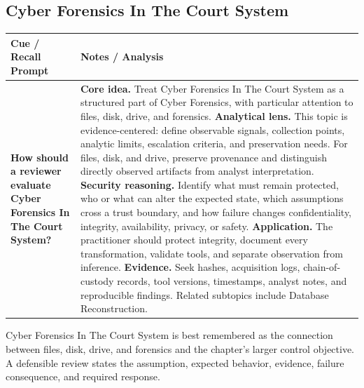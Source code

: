 \documentclass[11pt]{article}
\newcommand{\CornellHeader}{%
\rowcolor{Navy}\color{white}\bfseries Cue / Recall Prompt & \color{white}\bfseries Notes / Analysis\\\hline}
\newcommand{\CornellRow}[2]{%
\cellcolor{CueGray}\RaggedRight\textbf{#1} & \RaggedRight #2\\\hline}
\begin{document}
\subsection*{Cyber Forensics In The Court System}
\begin{longtable}{>{\RaggedRight\arraybackslash}p{}|>{\RaggedRight\arraybackslash}p{}}
\CornellHeader
\CornellRow{How should a reviewer evaluate Cyber Forensics In The Court System?}{\textbf{Core idea.} Treat Cyber Forensics In The Court System as a structured part of Cyber Forensics, with particular attention to files, disk, drive, and forensics. \textbf{Analytical lens.} This topic is evidence-centered: define observable signals, collection points, analytic limits, escalation criteria, and preservation needs. For files, disk, and drive, preserve provenance and distinguish directly observed artifacts from analyst interpretation. \textbf{Security reasoning.} Identify what must remain protected, who or what can alter the expected state, which assumptions cross a trust boundary, and how failure changes confidentiality, integrity, availability, privacy, or safety. \textbf{Application.} The practitioner should protect integrity, document every transformation, validate tools, and separate observation from inference. \textbf{Evidence.} Seek hashes, acquisition logs, chain-of-custody records, tool versions, timestamps, analyst notes, and reproducible findings. Related subtopics include Database Reconstruction.}
\end{longtable}
\begin{topicsummary}
Cyber Forensics In The Court System is best remembered as the connection between files, disk, drive, and forensics and the chapter's larger control objective. A defensible review states the assumption, expected behavior, evidence, failure consequence, and required response.
\end{topicsummary}
\end{document}
